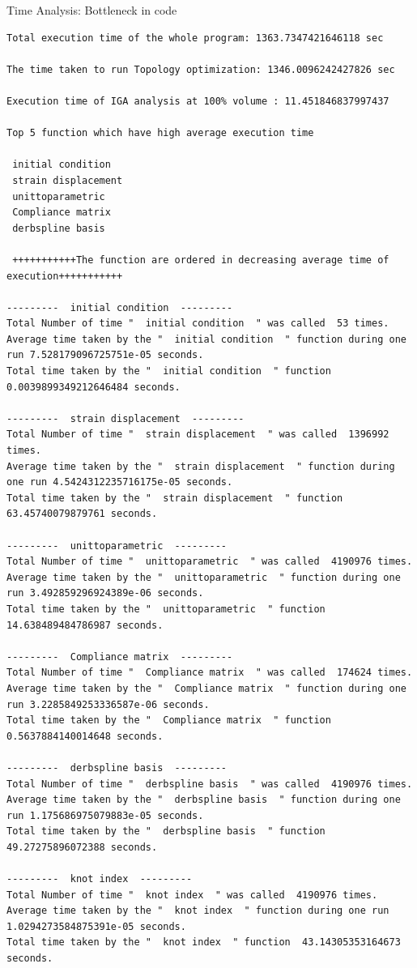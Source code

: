 \documentclass[a4paper,12pt,times]{article}
\begin{document}
\begin{section}{Time Analysis: Bottleneck in code}
\begin{lstlisting}
Total execution time of the whole program: 1363.7347421646118 sec 

The time taken to run Topology optimization: 1346.0096242427826 sec 

Execution time of IGA analysis at 100% volume : 11.451846837997437 

Top 5 function which have high average execution time 

 initial condition   
 strain displacement   
 unittoparametric   
 Compliance matrix   
 derbspline basis   

 +++++++++++The function are ordered in decreasing average time of execution+++++++++++ 

---------  initial condition  ---------
Total Number of time "  initial condition  " was called  53 times.
Average time taken by the "  initial condition  " function during one run 7.528179096725751e-05 seconds.
Total time taken by the "  initial condition  " function  0.0039899349212646484 seconds. 

---------  strain displacement  ---------
Total Number of time "  strain displacement  " was called  1396992 times.
Average time taken by the "  strain displacement  " function during one run 4.5424312235716175e-05 seconds.
Total time taken by the "  strain displacement  " function  63.45740079879761 seconds. 

---------  unittoparametric  ---------
Total Number of time "  unittoparametric  " was called  4190976 times.
Average time taken by the "  unittoparametric  " function during one run 3.492859296924389e-06 seconds.
Total time taken by the "  unittoparametric  " function  14.638489484786987 seconds. 

---------  Compliance matrix  ---------
Total Number of time "  Compliance matrix  " was called  174624 times.
Average time taken by the "  Compliance matrix  " function during one run 3.2285849253336587e-06 seconds.
Total time taken by the "  Compliance matrix  " function  0.5637884140014648 seconds. 

---------  derbspline basis  ---------
Total Number of time "  derbspline basis  " was called  4190976 times.
Average time taken by the "  derbspline basis  " function during one run 1.175686975079883e-05 seconds.
Total time taken by the "  derbspline basis  " function  49.27275896072388 seconds. 

---------  knot index  ---------
Total Number of time "  knot index  " was called  4190976 times.
Average time taken by the "  knot index  " function during one run 1.0294273584875391e-05 seconds.
Total time taken by the "  knot index  " function  43.14305353164673 seconds. 


\end{lstlisting}
\end{section}
\end{document}
